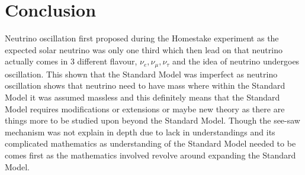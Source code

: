 \documentclass[11pt ,a4paper]{article}
\begin{document}
\section*{Conclusion}
Neutrino oscillation first proposed during the Homestake experiment as the expected solar neutrino was only one third which then lead on that neutrino actually comes in 3 different flavour, \(\nu_e, \nu_{\mu}, \nu_{\tau} \) and the idea of neutrino undergoes oscillation. This shown that the Standard Model was imperfect as neutrino oscillation shows that neutrino need to have mass where within the Standard Model it was assumed massless and this definitely means that the Standard Model requires modifications or extensions or maybe new theory as there are things more to be studied upon beyond the Standard Model. Though the see-saw mechanism was not explain in depth due to lack in understandings and its complicated mathematics as understanding of the Standard Model needed to be comes first as the mathematics involved revolve around expanding the Standard Model.
{}

\nocite{*}
\end{document}
